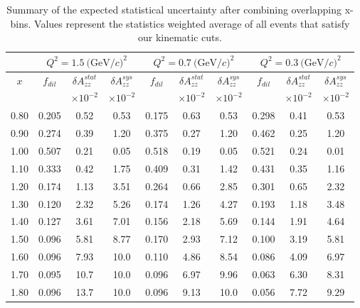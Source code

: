 \begin{table}
\begin{center}
\begin{tabular}{c|ccc|ccc|ccc}
 ~ & \multicolumn{3}{|c}{$Q^2=1.5\mathrm{~(GeV/}c)^2$} & \multicolumn{3}{|c}{$Q^2=0.7\mathrm{~(GeV/}c)^2$} & \multicolumn{3}{|c}{$Q^2=0.3\mathrm{~(GeV/}c)^2$} \\
 \hline
  $x$  & $f_{dil}$ & $\delta A_{zz}^{stat}$ & $\delta A_{zz}^{sys}$ & $f_{dil}$ & $\delta A_{zz}^{stat}$ & $\delta A_{zz}^{sys}$ & $f_{dil}$ & $\delta A_{zz}^{stat}$ & $\delta A_{zz}^{sys}$ \\
  &     & $\times 10^{-2}$  & $\times 10^{-2}$  &    & $\times 10^{-2}$  & $\times 10^{-2}$ &    & $\times 10^{-2}$  & $\times 10^{-2}$ \\
\hline\hline
 0.80	&  0.205	 & 0.52	& 0.53	& 0.175	 & 0.63	& 0.53 & 0.298 & 0.41 & 0.53 \\
 0.90	&  0.274	 & 0.39	& 1.20 	& 0.375	 & 0.27	& 1.20 & 0.462 & 0.25 & 1.20 \\
 1.00	&  0.507	 & 0.21	& 0.05 	& 0.518	 & 0.19	& 0.05 & 0.521 & 0.24 & 0.01 \\
 1.10	&  0.333	 & 0.42	& 1.75 	& 0.409	 & 0.31	& 1.42 & 0.431 & 0.35 & 1.16 \\
 1.20	&  0.174	 & 1.13	& 3.51 	& 0.264	 & 0.66	& 2.85 & 0.301 & 0.65 & 2.32 \\
 1.30	&  0.120	 & 2.32	& 5.26 	& 0.174	 & 1.26	& 4.27 & 0.193 & 1.18 & 3.48 \\
 1.40	&  0.127	 & 3.61	& 7.01 	& 0.156	 & 2.18	& 5.69 & 0.144 & 1.91 & 4.64 \\
 1.50	&  0.096	 & 5.81	& 8.77	& 0.170	 & 2.93	& 7.12 & 0.100 & 3.19 & 5.81 \\
 1.60	&  0.096	 & 7.93	& 10.0 	& 0.110	 & 4.86	& 8.54 & 0.086 & 4.09 & 6.97 \\
 1.70	&  0.095	 & 10.7	& 10.0 	& 0.096	 & 6.97	& 9.96 & 0.063 & 6.30 & 8.31 \\
 1.80	&  0.096	 & 13.7	& 10.0 	& 0.096	 & 9.13	& 10.0 & 0.056 & 7.72 & 9.29 \\
\hline\hline
\end{tabular}
\caption{\label{RATES2}Summary of the expected statistical uncertainty after combining overlapping x-bins.  Values represent the statistics weighted average of all events that satisfy our kinematic cuts. }
\end{center}
\end{table}


